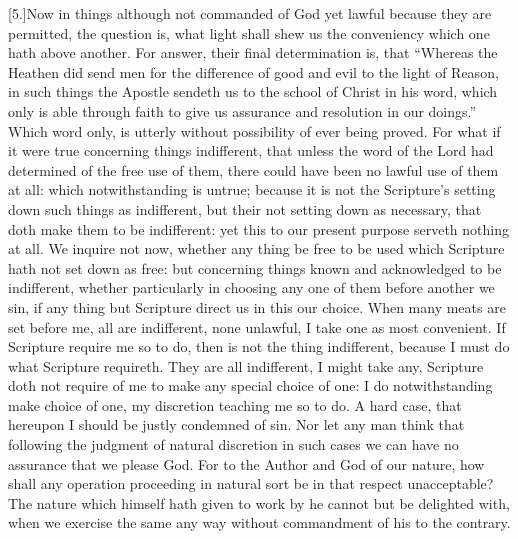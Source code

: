 [5.]Now in things although not commanded of God yet lawful because they are permitted, the question is, what light shall shew us the conveniency which one hath above another. For answer, their final determination is, that “Whereas the Heathen did send men for the difference of good and evil to the light of Reason, in such things the Apostle sendeth us to the school of Christ in his word, which only is able through faith to give us assurance and resolution in our doings.” Which word only, is utterly without possibility of ever being proved. For what if it were true concerning things indifferent, that unless the word of the Lord had determined of the free use of them, there could have been no lawful use of them at all: which notwithstanding is untrue; because it is not the Scripture’s setting down such things as indifferent, but their not setting down as necessary, that doth make them to be indifferent: yet this to our present purpose serveth nothing at all. We inquire not now, whether any thing be free to be used which Scripture hath not set down as free: but concerning things known and acknowledged to be indifferent, whether particularly in choosing any one of them before another we sin, if any thing but Scripture direct us in this our choice. When many meats are set before me, all are indifferent, none unlawful, I take one as most convenient. If Scripture require me so to do, then is not the thing indifferent, because I must do what Scripture requireth. They are all indifferent, I might take any, Scripture doth not require of me to make any special choice of one: I do notwithstanding make choice of one, my discretion teaching me so to do. A hard case, that hereupon I should be justly condemned of sin. Nor let any man think that following the judgment of natural discretion in such cases we can have no assurance that we please God. For to the Author and God of our nature, how shall any  operation proceeding in natural sort be in that respect unacceptable? The nature which himself hath given to work by he cannot but be delighted with, when we exercise the same any way without commandment of his to the contrary.

